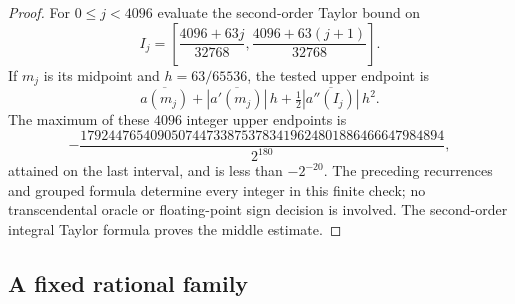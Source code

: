 \documentclass[11pt,a4paper]{amsart}
\theoremstyle{definition}
\theoremstyle{remark}
\numberwithin{equation}{section}
\begin{document}
\begin{proof}
For $0\le j<4096$ evaluate the second-order Taylor bound on
\[
 I_j=\left[\frac{4096+63j}{32768},
             \frac{4096+63(j+1)}{32768}\right].
\]
If $m_j$ is its midpoint and $h=63/65536$, the tested upper endpoint is
\[
 \overline{a(m_j)}+\overline{|a'(m_j)|}\,h
             +\tfrac12\overline{|a''(I_j)|}\,h^2.
\]
The maximum of these $4096$ integer upper endpoints is
\[
 -\frac{1792447654090507447338753783419624801886466647984894}{2^{180}},
\]
attained on the last interval, and is less than $-2^{-20}$. The preceding
recurrences and grouped formula determine every integer in this finite check;
no transcendental oracle or floating-point sign decision is involved. The
second-order integral Taylor formula proves the middle estimate.
\end{proof}

\subsection{A fixed rational family}
\end{document}
